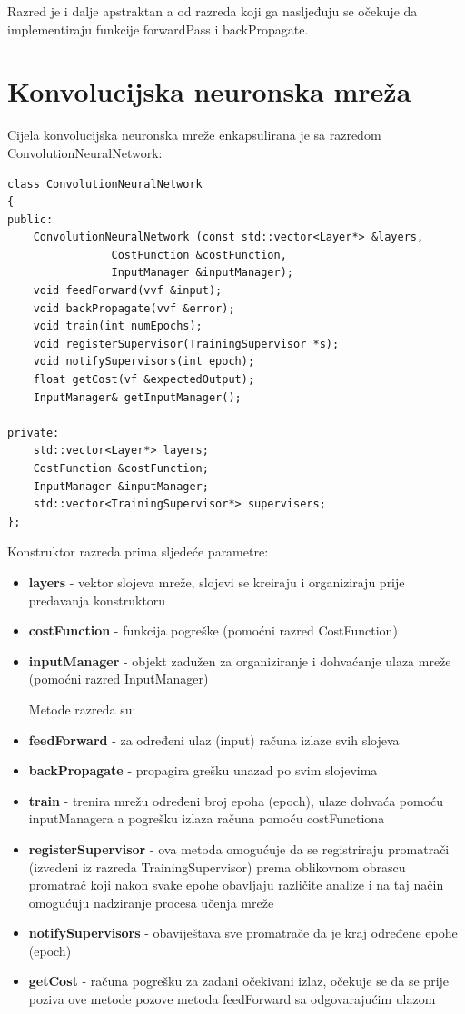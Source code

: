 \documentclass[times, utf8, zavrsni, numeric]{fer}
\begin{document}
Razred je i dalje apstraktan a od razreda koji ga nasljeđuju se očekuje da implementiraju funkcije forwardPass i backPropagate.

\section{Konvolucijska neuronska mreža}
Cijela konvolucijska neuronska mreže enkapsulirana je sa razredom ConvolutionNeuralNetwork:
\begin{lstlisting}[caption=Razred ConvolutionNeuralNetwork,
  label=CNN]
class ConvolutionNeuralNetwork
{
public:
    ConvolutionNeuralNetwork (const std::vector<Layer*> &layers, 
    			CostFunction &costFunction, 
    			InputManager &inputManager);
    void feedForward(vvf &input);
    void backPropagate(vvf &error);
    void train(int numEpochs);
    void registerSupervisor(TrainingSupervisor *s);
    void notifySupervisors(int epoch);
    float getCost(vf &expectedOutput);
    InputManager& getInputManager();
    
private:
    std::vector<Layer*> layers;
    CostFunction &costFunction;
    InputManager &inputManager;
    std::vector<TrainingSupervisor*> supervisers;
};
\end{lstlisting}

Konstruktor razreda prima sljedeće parametre:
\begin{itemize}
\item \textbf{layers} - vektor slojeva mreže, slojevi se kreiraju i organiziraju prije predavanja konstruktoru
\item \textbf{costFunction} - funkcija pogreške (pomoćni razred CostFunction)
\item \textbf{inputManager} - objekt zadužen za organiziranje i dohvaćanje ulaza mreže (pomoćni razred InputManager)

Metode razreda su:
\item \textbf{feedForward} - za određeni ulaz (input) računa izlaze svih slojeva
\item \textbf{backPropagate} - propagira grešku unazad po svim slojevima
\item \textbf{train} - trenira mrežu određeni broj epoha (epoch), ulaze dohvaća pomoću inputManagera a pogrešku izlaza računa pomoću costFunctiona
\item \textbf{registerSupervisor} - ova metoda omogućuje da se registriraju promatrači (izvedeni iz razreda TrainingSupervisor) prema oblikovnom obrascu promatrač koji nakon svake epohe obavljaju različite analize i na taj način omogućuju nadziranje procesa učenja mreže
\item \textbf{notifySupervisors} - obaviještava sve promatrače da je kraj određene epohe (epoch)
\item \textbf{getCost} - računa pogrešku za zadani očekivani izlaz, očekuje se da se prije poziva ove metode pozove metoda feedForward sa odgovarajućim ulazom
\end{itemize}
\end{document}
